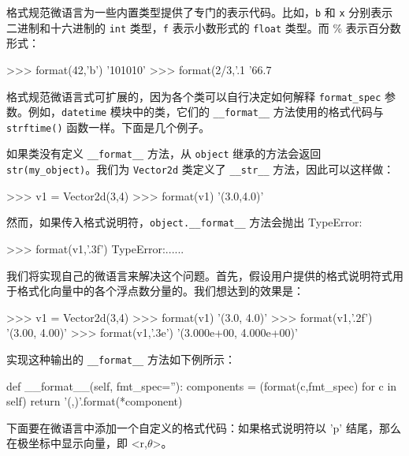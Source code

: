 格式规范微语言为一些内置类型提供了专门的表示代码。比如，\texttt{b} 和 \texttt{x} 分别表示二进制和十六进制的 \texttt{int} 类型，\texttt{f} 表示小数形式的 \texttt{float} 类型。而 \% 表示百分数形式：

\begin{python}
>>> format(42,'b')
'101010'
>>> format(2/3,'.1%
'66.7%
\end{python}

格式规范微语言式可扩展的，因为各个类可以自行决定如何解释 \texttt{format\_spec} 参数。例如，\texttt{datetime} 模块中的类，它们的 \texttt{\_\_format\_\_} 方法使用的格式代码与 \texttt{strftime()} 函数一样。下面是几个例子。


如果类没有定义 \texttt{\_\_format\_\_} 方法，从 \texttt{object} 继承的方法会返回 \texttt{str(my\_object)}。我们为 \texttt{Vector2d} 类定义了 \texttt{\_\_str\_\_} 方法，因此可以这样做：

\begin{python}
>>> v1 = Vector2d(3,4)
>>> format(v1)
'(3.0,4.0)'
\end{python}

然而，如果传入格式说明符，\texttt{object.\_\_format\_\_} 方法会抛出 TypeError:
\begin{python}
>>> format(v1,'.3f')
TypeError:......
\end{python}

我们将实现自己的微语言来解决这个问题。首先，假设用户提供的格式说明符式用于格式化向量中的各个浮点数分量的。我们想达到的效果是：

\begin{python}
>>> v1 = Vector2d(3,4)
>>> format(v1)
'(3.0, 4.0)'
>>> format(v1,'.2f')
'(3.00, 4.00)'
>>> format(v1,'.3e')
'(3.000e+00, 4.000e+00)'
\end{python}

实现这种输出的 \texttt{\_\_format\_\_} 方法如下例所示：
\begin{python}
def __format__(self, fmt_spec=''):
    components = (format(c,fmt_spec) for c in self)
    return '({},{})'.format(*component)
\end{python}

下面要在微语言中添加一个自定义的格式代码：如果格式说明符以 'p' 结尾，那么在极坐标中显示向量，即 <r,$\theta$>。

